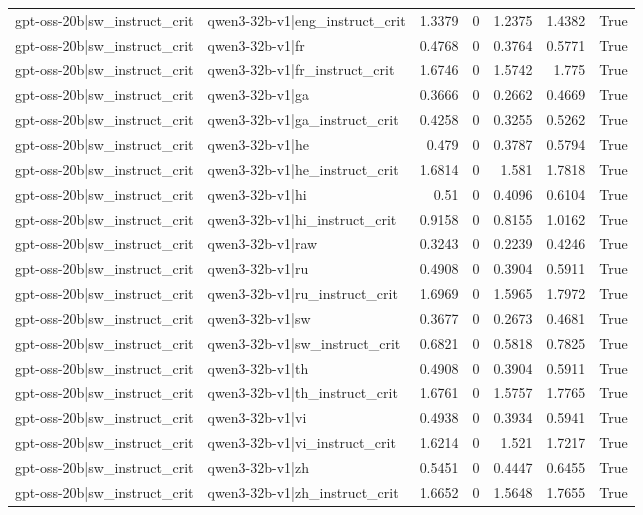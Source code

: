 \begin{table}
\begin{tabular}{l l r r r r l}
gpt-oss-20b|sw_instruct_crit & qwen3-32b-v1|eng_instruct_crit & 1.3379 & 0 & 1.2375 & 1.4382 & True \\
gpt-oss-20b|sw_instruct_crit & qwen3-32b-v1|fr & 0.4768 & 0 & 0.3764 & 0.5771 & True \\
gpt-oss-20b|sw_instruct_crit & qwen3-32b-v1|fr_instruct_crit & 1.6746 & 0 & 1.5742 & 1.775 & True \\
gpt-oss-20b|sw_instruct_crit & qwen3-32b-v1|ga & 0.3666 & 0 & 0.2662 & 0.4669 & True \\
gpt-oss-20b|sw_instruct_crit & qwen3-32b-v1|ga_instruct_crit & 0.4258 & 0 & 0.3255 & 0.5262 & True \\
gpt-oss-20b|sw_instruct_crit & qwen3-32b-v1|he & 0.479 & 0 & 0.3787 & 0.5794 & True \\
gpt-oss-20b|sw_instruct_crit & qwen3-32b-v1|he_instruct_crit & 1.6814 & 0 & 1.581 & 1.7818 & True \\
gpt-oss-20b|sw_instruct_crit & qwen3-32b-v1|hi & 0.51 & 0 & 0.4096 & 0.6104 & True \\
gpt-oss-20b|sw_instruct_crit & qwen3-32b-v1|hi_instruct_crit & 0.9158 & 0 & 0.8155 & 1.0162 & True \\
gpt-oss-20b|sw_instruct_crit & qwen3-32b-v1|raw & 0.3243 & 0 & 0.2239 & 0.4246 & True \\
gpt-oss-20b|sw_instruct_crit & qwen3-32b-v1|ru & 0.4908 & 0 & 0.3904 & 0.5911 & True \\
gpt-oss-20b|sw_instruct_crit & qwen3-32b-v1|ru_instruct_crit & 1.6969 & 0 & 1.5965 & 1.7972 & True \\
gpt-oss-20b|sw_instruct_crit & qwen3-32b-v1|sw & 0.3677 & 0 & 0.2673 & 0.4681 & True \\
gpt-oss-20b|sw_instruct_crit & qwen3-32b-v1|sw_instruct_crit & 0.6821 & 0 & 0.5818 & 0.7825 & True \\
gpt-oss-20b|sw_instruct_crit & qwen3-32b-v1|th & 0.4908 & 0 & 0.3904 & 0.5911 & True \\
gpt-oss-20b|sw_instruct_crit & qwen3-32b-v1|th_instruct_crit & 1.6761 & 0 & 1.5757 & 1.7765 & True \\
gpt-oss-20b|sw_instruct_crit & qwen3-32b-v1|vi & 0.4938 & 0 & 0.3934 & 0.5941 & True \\
gpt-oss-20b|sw_instruct_crit & qwen3-32b-v1|vi_instruct_crit & 1.6214 & 0 & 1.521 & 1.7217 & True \\
gpt-oss-20b|sw_instruct_crit & qwen3-32b-v1|zh & 0.5451 & 0 & 0.4447 & 0.6455 & True \\
gpt-oss-20b|sw_instruct_crit & qwen3-32b-v1|zh_instruct_crit & 1.6652 & 0 & 1.5648 & 1.7655 & True \\

\end{tabular}
\end{table}
